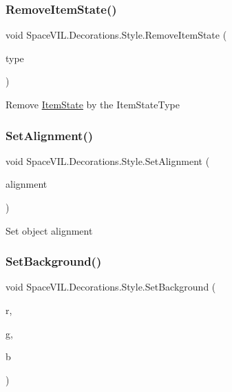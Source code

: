 \subsubsection{\texorpdfstring{Remove\+Item\+State()}{RemoveItemState()}}
{\footnotesize\ttfamily void Space\+V\+I\+L.\+Decorations.\+Style.\+Remove\+Item\+State (\begin{DoxyParamCaption}\item[{Item\+State\+Type}]{type }\end{DoxyParamCaption})\hspace{0.3cm}{\ttfamily [inline]}}



Remove \mbox{\hyperlink{class_space_v_i_l_1_1_decorations_1_1_item_state}{Item\+State}} by the Item\+State\+Type 

\mbox{\label{class_space_v_i_l_1_1_decorations_1_1_style_a49dfa21104c12d8d2c0078f3bd9310aa}} 
\subsubsection{\texorpdfstring{Set\+Alignment()}{SetAlignment()}}
{\footnotesize\ttfamily void Space\+V\+I\+L.\+Decorations.\+Style.\+Set\+Alignment (\begin{DoxyParamCaption}\item[{Item\+Alignment}]{alignment }\end{DoxyParamCaption})\hspace{0.3cm}{\ttfamily [inline]}}



Set object alignment 

\mbox{\label{class_space_v_i_l_1_1_decorations_1_1_style_a3000086edf6f2c8ce452e615f356e98a}} 
\subsubsection{\texorpdfstring{Set\+Background()}{SetBackground()}}
{\footnotesize\ttfamily void Space\+V\+I\+L.\+Decorations.\+Style.\+Set\+Background (\begin{DoxyParamCaption}\item[{int}]{r,  }\item[{int}]{g,  }\item[{int}]{b }\end{DoxyParamCaption})\hspace{0.3cm}{\ttfamily [inline]}}



